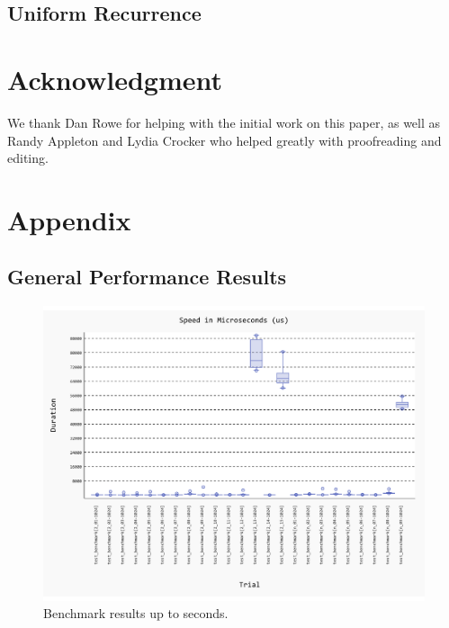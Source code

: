 \documentclass[conference]{IEEEtran}
\begin{document}
\subsection{Uniform Recurrence}


\section{Acknowledgment}

We thank Dan Rowe for helping with the initial work on this paper, as well as Randy Appleton and Lydia Crocker who helped greatly with proofreading and editing.

\section{Appendix}

\subsection{General Performance Results}

\begin{figure}[H]
    \centering
    \includegraphics[width=\linewidth]{figures/benchmark/20241122_154339.pdf}
    \caption{Benchmark results up to seconds.}
    \label{fig:benchmark_in_s}
\end{figure}
\end{document}
